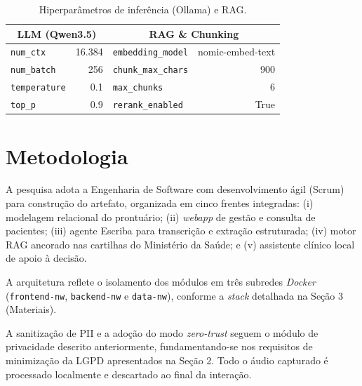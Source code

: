 \documentclass[12pt]{article}
\begin{document}
\begin{table}[H]
  \centering
  \caption{Hiperparâmetros de inferência (Ollama) e RAG.}
  \label{tab:hyperparams}
  \small
  \begin{tabular}{l r | l r}
    \toprule
    \multicolumn{2}{c}{\textbf{LLM (Qwen3.5)}} & \multicolumn{2}{c}{\textbf{RAG \& Chunking}} \\
    \midrule
    \texttt{num\_ctx}                          & 16.384 & \texttt{embedding\_model}  & nomic-embed-text \\
    \texttt{num\_batch}                        & 256    & \texttt{chunk\_max\_chars} & 900              \\
    \texttt{temperature}                       & 0.1    & \texttt{max\_chunks}       & 6                \\
    \texttt{top\_p}                            & 0.9    & \texttt{rerank\_enabled}   & True             \\
    \bottomrule
  \end{tabular}
\end{table}


\section{Metodologia}

A pesquisa adota a Engenharia de Software com desenvolvimento ágil (Scrum) para construção do artefato, organizada em cinco frentes integradas:
(i) modelagem relacional do prontuário;
(ii) \textit{webapp} de gestão e consulta de pacientes;
(iii) agente Escriba para transcrição e extração estruturada;
(iv) motor RAG ancorado nas cartilhas do Ministério da Saúde;
e (v) assistente clínico local de apoio à decisão.

A arquitetura reflete o isolamento dos módulos em três subredes \textit{Docker} (\texttt{frontend-nw}, \texttt{backend-nw} e \texttt{data-nw}), conforme a \textit{stack} detalhada na Seção 3 (Materiais). 

A sanitização de PII e a adoção do modo \textit{zero-trust} seguem o módulo de privacidade descrito anteriormente, fundamentando-se nos requisitos de minimização da LGPD apresentados na Seção 2.
Todo o áudio capturado é processado localmente e descartado ao final da interação.
\end{document}
